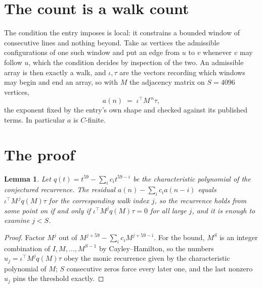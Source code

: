 \documentclass[11pt,a4paper]{article}
\theoremstyle{plain}
\newtheorem{lemma}[theorem]{Lemma}
\theoremstyle{definition}
\begin{document}
\section{The count is a walk count}

The condition the entry imposes is local: it constrains a bounded window of consecutive lines and nothing beyond. Take as vertices the admissible configurations of one such window and put an edge from $u$ to $v$ whenever $v$ may follow $u$, which the condition decides by inspection of the two.
An admissible array is then exactly a walk, and $\iota,\tau$ are the vectors recording which windows may begin and end an array, so with $M$ the adjacency matrix on $S=4096$ vertices,
\[
a(n)\;=\;\iota^{\!\top}M^{\,n}\tau ,
\]
the exponent fixed by the entry's own shape and checked against its published terms. In
particular $a$ is $C$-finite.

\section{The proof}

\begin{lemma}\label{lem:crit}
Let $q(t)=t^{59}-\sum_i c_it^{59-i}$ be the characteristic polynomial of the
conjectured recurrence. The residual $a(n)-\sum_ic_ia(n-i)$ equals
$\iota^{\!\top}M^{\,j}q(M)\tau$ for the corresponding walk index $j$, so the recurrence
holds from some point on if and only if $\iota^{\!\top}M^{j}q(M)\tau=0$ for all large $j$,
and it is enough to examine $j<S$.
\end{lemma}

\begin{proof}
Factor $M^{j}$ out of $M^{j+59}-\sum_ic_iM^{j+59-i}$. For the bound, $M^{S}$
is an integer combination of $I,M,\dots,M^{S-1}$ by Cayley--Hamilton, so the numbers
$u_j=\iota^{\!\top}M^{j}q(M)\tau$ obey the monic recurrence given by the characteristic
polynomial of $M$; $S$ consecutive zeros force every later one, and the last nonzero $u_j$
pins the threshold exactly.
\end{proof}
\end{document}
